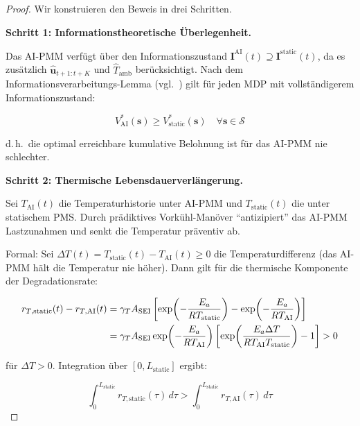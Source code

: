 ﻿\documentclass[12pt,a4paper]{article}
\begin{document}
	\begin{proof}
		Wir konstruieren den Beweis in drei Schritten.
		
		\textbf{Schritt 1: Informationstheoretische Überlegenheit.}
		
		Das AI-PMM verfügt über den Informationszustand
		$\mathbf{I}^\mathrm{AI}(t) \supseteq \mathbf{I}^\mathrm{static}(t)$,
		da es zusätzlich $\hat{\mathbf{u}}_{t+1:t+K}$ und $\hat{T}_\mathrm{amb}$
		berücksichtigt. Nach dem Informationsverarbeitungs-Lemma
		(vgl.\ \cite{Bertsekas2005}) gilt für jeden MDP mit vollständigerem
		Informationszustand:
		
		\begin{equation}
			V^*_\mathrm{AI}(\mathbf{s}) \geq V^*_\mathrm{static}(\mathbf{s})
			\quad \forall \mathbf{s} \in \mathcal{S}
		\end{equation}
		
		d.\,h.\ die optimal erreichbare kumulative Belohnung ist für das AI-PMM
		nie schlechter.
		
		\textbf{Schritt 2: Thermische Lebensdauerverlängerung.}
		
		Sei $T_\mathrm{AI}(t)$ die Temperaturhistorie unter AI-PMM und
		$T_\mathrm{static}(t)$ die unter statischem PMS. Durch prädiktives
		Vorkühl-Manöver ``antizipiert'' das AI-PMM Lastzunahmen und senkt
		die Temperatur präventiv ab.
		
		Formal: Sei $\Delta T(t) = T_\mathrm{static}(t) - T_\mathrm{AI}(t) \geq 0$
		die Temperaturdifferenz (das AI-PMM hält die Temperatur nie höher). Dann gilt
		für die thermische Komponente der Degradationsrate:
		
		\begin{align}
			r_{T,\mathrm{static}}(t) - r_{T,\mathrm{AI}}(t)
			&= \gamma_T A_\mathrm{SEI}\left[\exp\!\left(-\frac{E_a}{RT_\mathrm{static}}\right)
			- \exp\!\left(-\frac{E_a}{RT_\mathrm{AI}}\right)\right] \notag\\
			&= \gamma_T A_\mathrm{SEI} \exp\!\left(-\frac{E_a}{RT_\mathrm{AI}}\right)
			\left[\exp\!\left(\frac{E_a \Delta T}{R T_\mathrm{AI} T_\mathrm{static}}\right) - 1\right]
			> 0
			\label{eq:temp_proof}
		\end{align}
		
		für $\Delta T > 0$. Integration über $[0, L_\mathrm{static}]$ ergibt:
		
		\begin{equation}
			\int_0^{L_\mathrm{static}} r_{T,\mathrm{static}}(\tau)\,d\tau >
			\int_0^{L_\mathrm{static}} r_{T,\mathrm{AI}}(\tau)\,d\tau
			\label{eq:temp_integral_ineq}
		\end{equation}
		

\end{proof}
\end{document}
